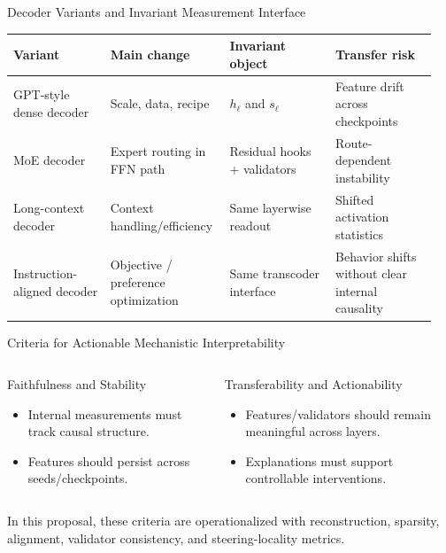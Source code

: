 \begin{frame}{Decoder Variants and Invariant Measurement Interface}
    \scriptsize
    \begin{table}
        \centering
        \setlength{\tabcolsep}{3pt}
        \begin{tabular}{@{}p{0.22\linewidth}p{0.26\linewidth}p{0.24\linewidth}p{0.23\linewidth}@{}}
            \toprule
            \textbf{Variant} & \textbf{Main change} & \textbf{Invariant object} & \textbf{Transfer risk} \\
            \midrule
            GPT-style dense decoder & Scale, data, recipe & $h_{\ell}$ and $s_{\ell}$ & Feature drift across checkpoints \\
            \addlinespace[0.2em]
            MoE decoder & Expert routing in FFN path & Residual hooks + validators & Route-dependent instability \\
            \addlinespace[0.2em]
            Long-context decoder & Context handling/efficiency & Same layerwise readout & Shifted activation statistics \\
            \addlinespace[0.2em]
            Instruction-aligned decoder & Objective / preference optimization & Same transcoder interface & Behavior shifts without clear internal causality \\
            \bottomrule
        \end{tabular}
        \setlength{\tabcolsep}{6pt}
    \end{table}
\end{frame}

\begin{frame}{Criteria for Actionable Mechanistic Interpretability}
    \small
    \begin{columns}[T,onlytextwidth]
        \begin{block}{Faithfulness and Stability}
            \begin{itemize}
                \item Internal measurements must track causal structure.
                \item Features should persist across seeds/checkpoints.
            \end{itemize}
        \end{block}
        \begin{block}{Transferability and Actionability}
            \begin{itemize}
                \item Features/validators should remain meaningful across layers.
                \item Explanations must support controllable interventions.
            \end{itemize}
        \end{block}
    \end{columns}
    \vspace{0.3em}
    \footnotesize
    In this proposal, these criteria are operationalized with reconstruction, sparsity, alignment, validator consistency, and steering-locality metrics.
\end{frame}

